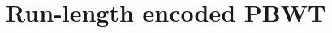 \documentclass[]{beamer}
\def\SMEM{\mbox{\rm {\sf SMEM}}}
\begin{document}
\section{Run-length encoded PBWT}
\end{document}

